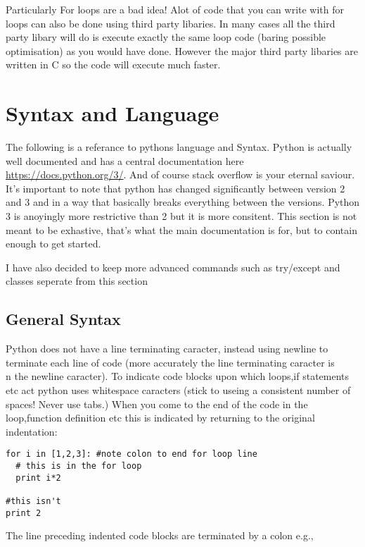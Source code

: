 \documentclass[11pt,a4paper]{article}
\begin{document}
Particularly For loops are a bad idea! Alot of code that you can write with for loops can also be done using third party libaries. In many cases all the third party libary will do is execute exactly the same loop code (baring possible optimisation) as you would have done. However the major third party libaries are written in C so the code will execute much faster.

\section{Syntax and Language}

The following is a referance to pythons language and Syntax. Python is actually well documented and has a central documentation here \url{https://docs.python.org/3/}. And of course stack overflow is your eternal saviour. It's important to note that python has changed significantly between version 2 and 3 and in a way that basically breaks everything between the versions. Python 3 is anoyingly more restrictive than 2 but it is more consitent. This section is not meant to be exhastive, that's what the main documentation is for, but to contain enough to get started. 

I have also decided to keep more advanced commands such as try/except and classes seperate from this section

\subsection{General Syntax}

Python does not have a line terminating caracter, instead using newline to terminate each line of code (more accurately the line terminating caracter is \\n the newline caracter). To indicate code blocks upon which loops,if statements etc act python uses whitespace caracters (stick to useing a consistent number of spaces! Never use tabs.) When you come to the end of the code in the loop,function definition etc this is indicated by returning to the original indentation:

\begin{verbatim}
for i in [1,2,3]: #note colon to end for loop line
  # this is in the for loop
  print i*2

#this isn't
print 2
\end{verbatim}

The line preceding indented code blocks are terminated by a colon e.g.,
\end{document}
